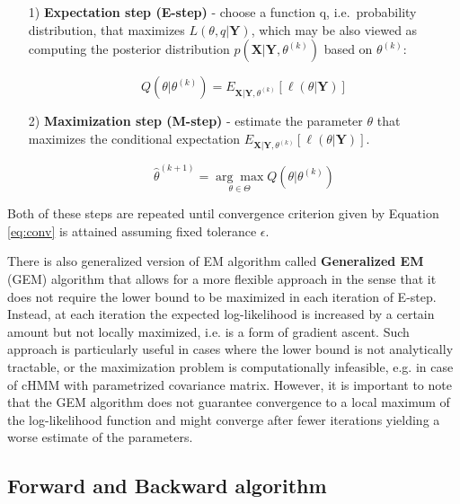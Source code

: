 \begin{itemize}
\item[1)] \textbf{Expectation step (E-step)} - choose a function q, i.e.\ probability distribution, that maximizes $L(\theta, q|\textbf{Y})$, which may be also viewed as 
                                               computing the posterior distribution $p(\textbf{X}|\textbf{Y},\theta^{(k)})$ based on $\theta^{(k)}$:

\begin{equation}
    Q(\theta|\theta^{(k)}) = E_{\textbf{X}|\textbf{Y},\theta^{(k)}} [\ell(\theta|\textbf{Y})]
\end{equation}

\item[2)] \textbf{Maximization step (M-step)} - estimate the parameter $\theta$ that maximizes the conditional expectation $E_{\textbf{X}|\textbf{Y},\theta^{(k)}} [\ell(\theta|\textbf{Y})]$.

\begin{equation}
    \hat{\theta}^{(k+1)} = \underset{\theta \in \Theta}{\arg\max} Q(\theta|\theta^{(k)}) 
\end{equation}

\end{itemize}

Both of these steps are repeated until convergence criterion given by Equation \ref{eq:conv} is attained assuming fixed tolerance $\epsilon$.

There is also generalized version of EM algorithm called \textbf{Generalized EM} (GEM) algorithm that allows for a more flexible approach
in the sense that it does not require the lower bound to be maximized in each iteration of E-step. Instead, at each iteration
the expected log-likelihood is increased by a certain amount but not locally maximized, i.e. is a form of gradient ascent. Such approach 
is particularly useful in cases where the lower bound is not analytically tractable, or the maximization problem is computationally infeasible, e.g. in case of cHMM with 
parametrized covariance matrix. However, it is important to note that the GEM algorithm does not guarantee convergence to a local maximum 
of the log-likelihood function and might converge after fewer iterations yielding a worse estimate of the parameters. \citep{Bishop2006} 

\subsection{Forward and Backward algorithm}

